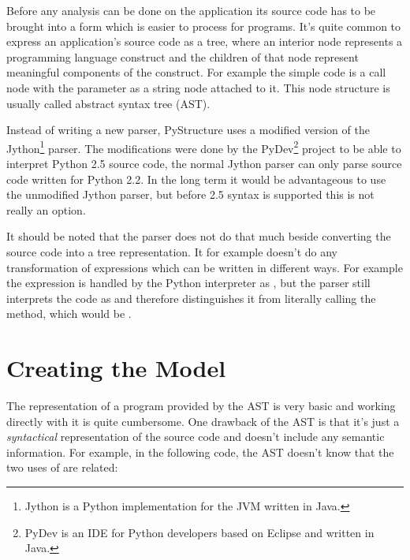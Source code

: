 \documentclass[12pt,halfparskip]{scrreprt}
\begin{document}
Before any analysis can be done on the application its source code has to be brought into a form which is easier to process for programs. It's quite common to express an application's source code as a tree, where an interior node represents a programming language construct and the children of that node represent meaningful components of the construct. For example the simple code  is a call node with the parameter as a string node attached to it. This node structure is usually called abstract syntax tree (AST).


Instead of writing a new parser, PyStructure uses a modified version of the Jython\footnote{Jython is a Python implementation for the JVM written in Java.} parser. The modifications were done by the PyDev\footnote{PyDev is an IDE for Python developers based on Eclipse and written in Java.} project to be able to interpret Python 2.5 source code, the normal Jython parser can only parse source code written for Python 2.2. In the long term it would be advantageous to use the unmodified Jython parser, but before 2.5 syntax is supported this is not really an option.

It should be noted that the parser does not do that much beside converting the source code into a tree representation. It for example doesn't do any transformation of expressions which can be written in different ways. For example the expression  is handled by the Python interpreter as , but the parser still interprets the code as  and therefore distinguishes it from literally calling the  method, which would be . 


\section{Creating the Model}


The representation of a program provided by the AST is very basic and working directly with it is quite cumbersome. 
One drawback of the AST is that it's just a \emph{syntactical} representation of the source code and doesn't include any semantic information. For example, in the following code, the AST doesn't know that the two uses of  are related:
\end{document}
